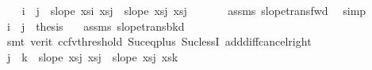 \begin{isabellebody}
\ \ \isamarkupfalse%
\ {}{\isacharcolon}{\kern0pt}{\isachardoublequoteopen}i{\isacharplus}{\kern0pt}{}\ {\isacharless}{\kern0pt}\ j\ {\isasymLongrightarrow}\ slope\ {\isacharparenleft}{\kern0pt}xs{\isacharbang}{\kern0pt}i{\isacharparenright}{\kern0pt}\ {\isacharparenleft}{\kern0pt}xs{\isacharbang}{\kern0pt}{\isacharparenleft}{\kern0pt}j{\isacharminus}{\kern0pt}{}{\isacharparenright}{\kern0pt}{\isacharparenright}{\kern0pt}\ {\isacharless}{\kern0pt}\ slope\ {\isacharparenleft}{\kern0pt}xs{\isacharbang}{\kern0pt}{\isacharparenleft}{\kern0pt}j{\isacharminus}{\kern0pt}{}{\isacharparenright}{\kern0pt}{\isacharparenright}{\kern0pt}\ {\isacharparenleft}{\kern0pt}xs{\isacharbang}{\kern0pt}j{\isacharparenright}{\kern0pt}{\isachardoublequoteclose}\ \isanewline
\ \ \ \ \isamarkupfalse%
\ assms\ slope{\isacharunderscore}{\kern0pt}trans{\isacharunderscore}{\kern0pt}fwd\ \isamarkupfalse%
\ simp\isanewline
\ \ \isamarkupfalse%
\ {}{\isacharcolon}{\kern0pt}{\isachardoublequoteopen}i{\isacharplus}{\kern0pt}{}\ {\isacharequal}{\kern0pt}\ j\ {\isasymLongrightarrow}\ {\isacharquery}{\kern0pt}thesis{\isachardoublequoteclose}\ \isamarkupfalse%
\ {\isachardoublequoteopen}{}{\isachardoublequoteclose}\ assms\ slope{\isacharunderscore}{\kern0pt}trans{\isacharunderscore}{\kern0pt}bkd\isanewline
\ \ \ \ \isamarkupfalse%
\ {\isacharparenleft}{\kern0pt}smt\ {\isacharparenleft}{\kern0pt}verit{\isacharcomma}{\kern0pt}\ ccfv{\isacharunderscore}{\kern0pt}threshold{\isacharparenright}{\kern0pt}\ Suc{\isacharunderscore}{\kern0pt}eq{\isacharunderscore}{\kern0pt}plus{}\ Suc{\isacharunderscore}{\kern0pt}lessI\ add{\isacharunderscore}{\kern0pt}diff{\isacharunderscore}{\kern0pt}cancel{\isacharunderscore}{\kern0pt}right{\isacharprime}{\kern0pt}{\isacharparenright}{\kern0pt}\isanewline
\ \ \isamarkupfalse%
\ {}{\isacharcolon}{\kern0pt}{\isachardoublequoteopen}j{\isacharplus}{\kern0pt}{}\ {\isacharless}{\kern0pt}\ k\ {\isasymLongrightarrow}\ slope\ {\isacharparenleft}{\kern0pt}xs{\isacharbang}{\kern0pt}j{\isacharparenright}{\kern0pt}\ {\isacharparenleft}{\kern0pt}xs{\isacharbang}{\kern0pt}{\isacharparenleft}{\kern0pt}j{\isacharplus}{\kern0pt}{}{\isacharparenright}{\kern0pt}{\isacharparenright}{\kern0pt}\ {\isacharless}{\kern0pt}\ slope\ {\isacharparenleft}{\kern0pt}xs{\isacharbang}{\kern0pt}j{\isacharparenright}{\kern0pt}\ {\isacharparenleft}{\kern0pt}xs{\isacharbang}{\kern0pt}k{\isacharparenright}{\kern0pt}{\isachardoublequoteclose}\ \isanewline

\end{isabellebody}
